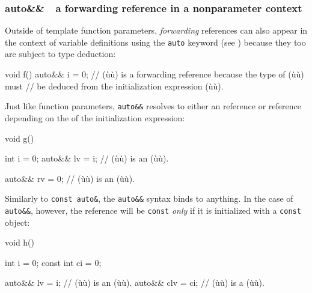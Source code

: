 \subsubsection[\lstinline!auto&&! --- a forwarding reference in a nonparameter context]{{\SubsubsecCode auto\&\&}~{\subsubemdash}~a forwarding reference in a nonparameter context}\label{auto-a-forwarding-reference-in-a-non-parameter-context}

Outside of template function parameters, \emph{forwarding} references
can also appear in the context of variable definitions using the
\lstinline!auto! keyword (see )
because they too are subject to type
deduction:

\begin{emcppslisting}
void f()
{
    auto&& i = 0;  // (ù{}ù) is a forwarding reference because the type of (ù{}ù) must
                   // be deduced from the initialization expression (ù{}ù).
}
\end{emcppslisting}

\noindent Just like function parameters, \lstinline!auto&&! resolves to either an
 reference or  reference depending on the
 of the initialization expression:

\begin{emcppslisting}
void g()
{
    int i = 0;
    auto&& lv = i;  // (ù{}ù) is an (ù{}ù).

    auto&& rv = 0;  // (ù{}ù) is an (ù{}ù).
}
\end{emcppslisting}

\noindent Similarly to \lstinline!const!~\lstinline!auto&!, the \lstinline!auto&&!
syntax binds to anything. In the case of \lstinline!auto&&!, however, the reference will be \lstinline!const! \emph{only} if it is initialized with a \lstinline!const! object:

\begin{emcppslisting}
void h()
{
    int        i = 0;
    const int ci = 0;

    auto&& lv  = i;   // (ù{}ù) is an (ù{}ù).
    auto&& clv = ci;  // (ù{}ù) is a (ù{}ù).
}
\end{emcppslisting}

